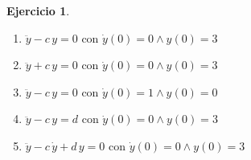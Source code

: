 \documentclass[a4paper,12pt,twoside]{book}
\newtheorem{ejercicio}{{Ejercicio}}[chapter]
\begin{document}
\begin{mdframed}[style=ejercicio-facil]
    \begin{ejercicio}
    \end{ejercicio}
    \begin{enumerate}
        \item $\ddot{y} - c \, y = 0$ con $\dot{y}(0)=0 \land y(0)=3$
        \item $\ddot{y} + c \, y = 0$ con $\dot{y}(0)=0 \land y(0)=3$
        \item $\ddot{y} - c \, y = 0$ con $\dot{y}(0)=1 \land y(0)=0$
        \item $\ddot{y} - c \, y = d$ con $\dot{y}(0)=0 \land y(0)=3$
        \item $\ddot{y} - c \, \dot{y} + d \, y = 0$ con $\dot{y}(0)=0 \land y(0)=3$
    \end{enumerate}
\end{mdframed}
\end{document}
